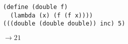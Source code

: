 \documentclass[a4paper,12pt]{article}
\begin{document}
\begin{lstlisting}
(define (double f)
  (lambda (x) (f (f x))))
(((double (double double)) inc) 5)
\end{lstlisting}
$\rightarrow 21$
\end{document}
